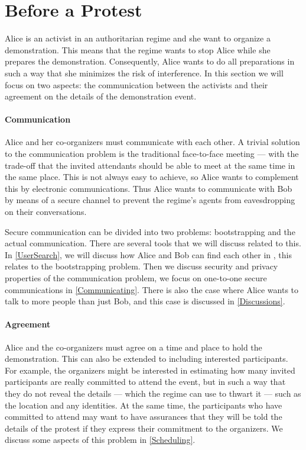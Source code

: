 \section{Before a Protest}
\label{BeforeProtest}

Alice is an activist in an authoritarian regime and she want to organize 
a demonstration.
This means that the regime wants to stop Alice while she prepares the 
demonstration.
Consequently, Alice wants to do all preparations in such a way that she 
minimizes the risk of interference.
In this section we will focus on two aspects: the communication between the 
activists and their agreement on the details of the demonstration event.

\paragraph{Communication}

Alice and her co-organizers must communicate with each other.
A trivial solution to the communication problem is the traditional face-to-face 
meeting --- with the trade-off that the invited attendants should be able to 
meet at the same time in the same place.
This is not always easy to achieve, so Alice wants to complement this by 
electronic communications.
Thus Alice wants to communicate with Bob by means of a secure channel to 
prevent the regime's agents from eavesdropping on their conversations.

Secure communication can be divided into two problems: bootstrapping and the 
actual communication.
There are several tools that we will discuss related to this.
In \cref{UserSearch}, we will discuss how Alice and Bob can find each other in 
, this relates to the bootstrapping problem.
Then we discuss security and privacy properties of the communication problem, 
we focus on one-to-one secure communications in \cref{Communicating}.
There is also the case where Alice wants to talk to more people than just Bob, 
and this case is discussed in \cref{Discussions}.

\paragraph{Agreement}

Alice and the co-organizers must agree on a time and place to hold the 
demonstration.
This can also be extended to including interested participants.
For example, the organizers might be interested in estimating how many invited 
participants are really committed to attend the event, but in such a way that 
they do not reveal the details --- which the regime can use to thwart it --- 
such as the location and any identities.
At the same time, the participants who have committed to attend may want to 
have assurances that they will be told the details of the protest if they 
express their commitment to the organizers.
We discuss some aspects of this problem in \cref{Scheduling}.

